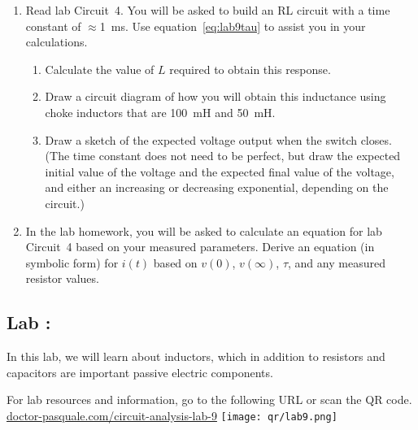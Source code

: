 \begin{enumerate}
\item Read lab Circuit~4. You will be asked to build an RL circuit with a time constant of $\approx$1~ms. Use equation~\ref{eq:lab9tau} to assist you in your calculations.
\begin{enumerate}
	\item Calculate the value of $L$ required to obtain this response.

	\item Draw a circuit diagram of how you will obtain this inductance using choke inductors that are 100~mH and 50~mH.

	\item Draw a sketch of the expected voltage output when the switch closes. (The time constant does not need to be perfect, but draw the expected initial value of the voltage and the expected final value of the voltage, and either an increasing or decreasing exponential, depending on the circuit.)
\end{enumerate}

\item In the lab homework, you will be asked to calculate an equation for lab Circuit~4 based on your measured parameters. Derive an equation (in symbolic form) for $i(t)$ based on $v(0)$, $v(\infty)$, $\tau$, and any measured resistor values.


\end{enumerate}
\cleardoublepage

\begin{center}
	\section*{Lab \labNumber: \labName}
\end{center}
In this lab, we will learn about inductors, which in addition to resistors and capacitors are important passive electric components.
\vspace{0.25cm}

\begin{equipment}

For lab resources and information, go to the following URL or scan the QR code.
\href{https://doctor-pasquale.com/circuit-analysis-lab-9}{doctor-pasquale.com/circuit-analysis-lab-9}
\tcblower
\texttt{[image: qr/lab9.png]}
\end{equipment}



